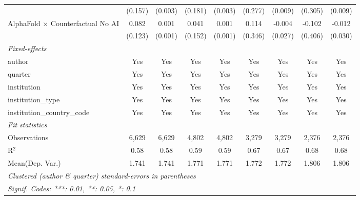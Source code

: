 \begin{tabular}{lcccccccc}
                                            & (0.157) & (0.003) & (0.181) & (0.003) & (0.277)     & (0.009) & (0.305)      & (0.009)\\   
   AlphaFold $\times$ Counterfactual No AI  & 0.082   & 0.001   & 0.041   & 0.001   & 0.114       & -0.004  & -0.102       & -0.012\\   
                                            & (0.123) & (0.001) & (0.152) & (0.001) & (0.346)     & (0.027) & (0.406)      & (0.030)\\   
   \midrule
   \emph{Fixed-effects}\\
   author                                   & Yes     & Yes     & Yes     & Yes     & Yes         & Yes     & Yes          & Yes\\  
   quarter                                  & Yes     & Yes     & Yes     & Yes     & Yes         & Yes     & Yes          & Yes\\  
   institution                              & Yes     & Yes     & Yes     & Yes     & Yes         & Yes     & Yes          & Yes\\  
   institution\_type                        & Yes     & Yes     & Yes     & Yes     & Yes         & Yes     & Yes          & Yes\\  
   institution\_country\_code               & Yes     & Yes     & Yes     & Yes     & Yes         & Yes     & Yes          & Yes\\  
   \midrule
   \emph{Fit statistics}\\
   Observations                             & 6,629   & 6,629   & 4,802   & 4,802   & 3,279       & 3,279   & 2,376        & 2,376\\  
   R$^2$                                    & 0.58    & 0.58    & 0.59    & 0.59    & 0.67        & 0.67    & 0.68         & 0.68\\  
Mean(Dep. Var.) & 1.741 & 1.741 & 1.771 & 1.771 & 1.772 & 1.772 & 1.806 & 1.806 \\
   \midrule \midrule
   \multicolumn{9}{l}{\emph{Clustered (author \& quarter) standard-errors in parentheses}}\\
   \multicolumn{9}{l}{\emph{Signif. Codes: ***: 0.01, **: 0.05, *: 0.1}}\\
\end{tabular}
\par\endgroup
